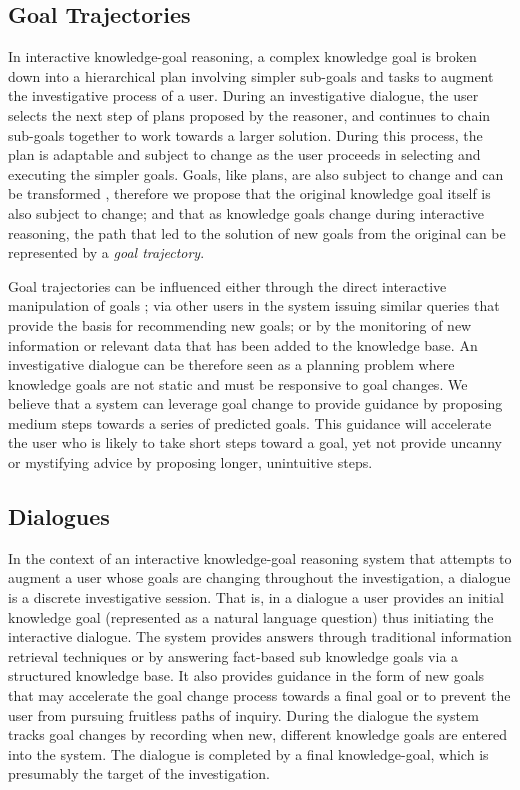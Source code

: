 \documentclass{llncs}
\begin{document}
\subsection{Goal Trajectories}
%
In interactive knowledge-goal reasoning, a complex knowledge goal is broken down into a hierarchical plan involving simpler sub-goals and tasks to augment the investigative process of a user. During an investigative dialogue, the user selects the next step of plans proposed by the reasoner, and continues to chain sub-goals together to work towards a larger solution. During this process, the plan is adaptable and subject to change as the user proceeds in selecting and executing the simpler goals. Goals, like plans, are also subject to change and can be transformed \cite{cox_goal_1998}, therefore we propose that the original knowledge goal itself is also subject to change; and that as knowledge goals change during interactive reasoning, the path that led to the solution of new goals from the original can be represented by a \textit{goal trajectory}.

	Goal trajectories can be influenced either through the direct interactive manipulation of goals \cite{cox_mixed-initiative_2007}; via other users in the system issuing similar queries that provide the basis for recommending new goals; or by the monitoring of new information or relevant data that has been added to the knowledge base. An investigative dialogue can be therefore seen as a planning problem where knowledge goals are not static and must be responsive to goal changes. We believe that a system can leverage goal change to provide guidance by proposing medium steps towards a series of predicted goals. This guidance will accelerate the user who is likely to take short steps toward a goal, yet not provide uncanny or mystifying advice by proposing longer, unintuitive steps.


\subsection{Dialogues}

In the context of an interactive knowledge-goal reasoning system that attempts to augment a user whose goals are changing throughout the investigation, a dialogue is a discrete investigative session. That is, in a dialogue a user provides an initial knowledge goal (represented as a natural language question) thus initiating the interactive dialogue. The system provides answers through traditional information retrieval techniques or by answering fact-based sub knowledge goals via a structured knowledge base. It also provides guidance in the form of new goals that may accelerate the goal change process towards a final goal or to prevent the user from pursuing fruitless paths of inquiry. During the dialogue the system tracks goal changes by recording when new, different knowledge goals are entered into the system. The dialogue is completed by a final knowledge-goal, which is presumably the target of the investigation.
\end{document}
